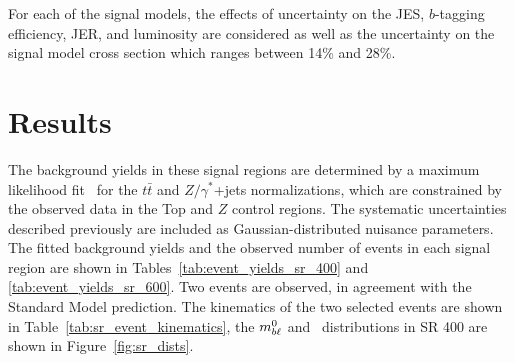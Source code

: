 \begin{table}[ht]
\caption{Summary of the effect of each considered sources of systematic
  uncertainty on the background estimate in SR~400 and SR~600. Several
  sources of theoretical systematic uncertainty which have a small
  effect on the total background estimate are grouped into the
  ``Other theory'' category.
}
\label{tab:systematic_breakdown}
%
\end{table}

For each of the signal models, the effects of uncertainty on the JES,
$b$-tagging efficiency, JER, and luminosity are considered as well as the
uncertainty on the signal model cross section which ranges between 14\%
and 28\%.

\section{Results}
\label{sec:results}

The background yields in these signal regions are determined by a
maximum likelihood fit~\cite{Baak:2014wma} for the $t\bar{t}$ and
$Z/\gamma^{*}$+jets
normalizations, which are constrained by the observed data in the Top
and $Z$ control regions.  The systematic uncertainties described
previously are included as Gaussian-distributed nuisance parameters.
The fitted background yields and the observed number of events in each
signal region are shown in Tables~\ref{tab:event_yields_sr_400} and
\ref{tab:event_yields_sr_600}. Two events are observed, in agreement with
the Standard Model prediction.  The kinematics of the two selected events
are shown in Table~\ref{tab:sr_event_kinematics}, the $m_{b\ell}^0$ and
\HT\ distributions in SR 400 are shown in Figure~\ref{fig:sr_dists}.

